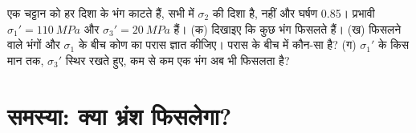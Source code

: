 \begin{exercise}[$\star\star\star$]\label{exo:b1:stress-strain-rheology:12}
एक चट्टान को हर दिशा के भंग काटते हैं, सभी में $\sigma_2$ की दिशा है,  नहीं और घर्षण 0.85। प्रभावी  $\sigma_1' = \qty{110}{MPa}$ और $\sigma_3' = \qty{20}{MPa}$ हैं। (क) दिखाइए कि कुछ भंग फिसलते हैं। (ख) फिसलने वाले भंगों और $\sigma_1$ के बीच कोण का परास ज्ञात कीजिए। परास के बीच में कौन-सा है? (ग) $\sigma_1'$ के किस मान तक, $\sigma_3'$ स्थिर रखते हुए, कम से कम एक भंग अब भी फिसलता है?
\end{exercise}

\section{समस्या: क्या भ्रंश फिसलेगा?}


